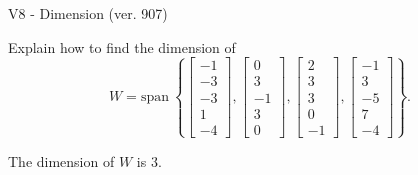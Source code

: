\begin{exercise}
  \begin{exerciseTitle}V8 - Dimension (ver. 907)\end{exerciseTitle}
  \begin{exerciseStatement}
    Explain how to find the dimension of 
\[W=\mathrm{span}\ \left\{\left[\begin{array}{r}
-1 \\
-3 \\
-3 \\
1 \\
-4
\end{array}\right] , \left[\begin{array}{r}
0 \\
3 \\
-1 \\
3 \\
0
\end{array}\right] , \left[\begin{array}{r}
2 \\
3 \\
3 \\
0 \\
-1
\end{array}\right] , \left[\begin{array}{r}
-1 \\
3 \\
-5 \\
7 \\
-4
\end{array}\right]\right\}.\]



  \end{exerciseStatement}
  \begin{exerciseAnswer}
   The dimension of \(W\) is  \(3\).
  


  \end{exerciseAnswer}
\end{exercise}
